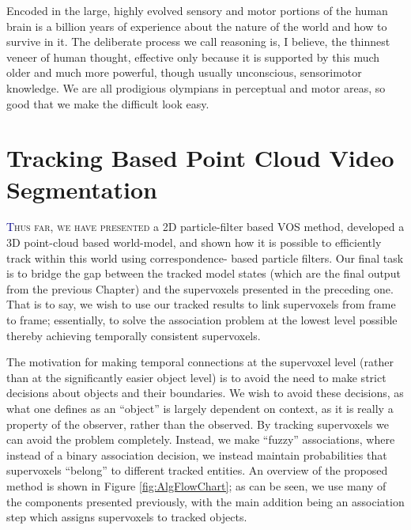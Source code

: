 \begin{savequote}[75mm]
Encoded in the large, highly evolved sensory and motor portions of the human brain is a billion years of experience about the nature of the world and how to survive in it. The deliberate process we call reasoning is, I believe, the thinnest veneer of human thought, effective only because it is supported by this much older and much more powerful, though usually unconscious, sensorimotor knowledge. We are all prodigious olympians in perceptual and motor areas, so good that we make the difficult look easy. 
\end{savequote}


\chapter{Tracking Based Point Cloud Video Segmentation}
\label{Chap:TrackingBasedSegmentation}
\lettrine[lines=3, loversize=0.3]{\textcolor{DarkBlue}T}{hus far, we have presented} a 2D particle-filter based VOS method, developed a 3D point-cloud based world-model, and shown how it is possible to efficiently track within this world using correspondence- based particle filters. Our final task is to bridge the gap between the tracked model states (which are the final output from the previous Chapter) and the supervoxels presented in the preceding one. That is to say, we wish to use our tracked results to link supervoxels from frame to frame; essentially, to solve the association problem at the lowest level possible thereby achieving temporally consistent supervoxels.

The motivation for making temporal connections at the supervoxel level (rather than at the significantly easier object level) is to avoid the need to make strict decisions about objects and their boundaries. We wish to avoid these decisions, as what one defines as an ``object'' is largely dependent on context, as it is really a property of the observer, rather than the observed. By tracking supervoxels we can avoid the problem completely. Instead, we make ``fuzzy'' associations, where instead of a binary association decision, we instead maintain probabilities that supervoxels ``belong'' to different tracked entities. An overview of the proposed method is shown in Figure \ref{fig:AlgFlowChart}; as can be seen, we use many of the components presented previously, with the main addition being an association step which assigns supervoxels to tracked objects.

